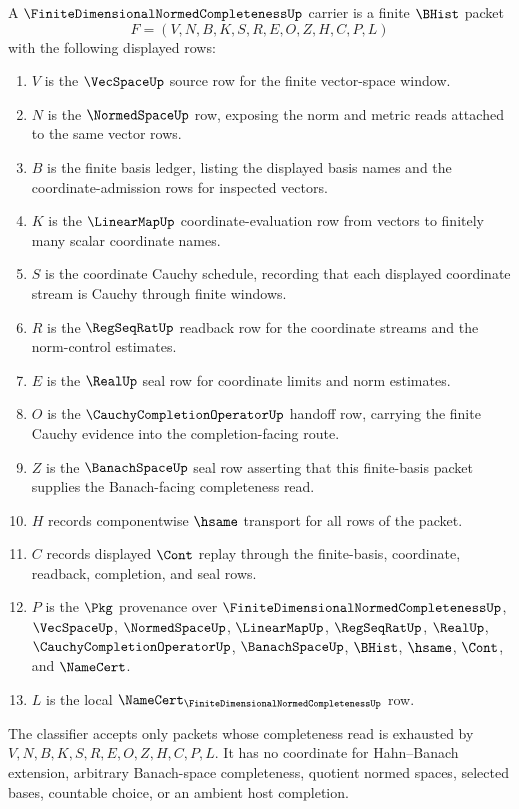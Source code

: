 \begin{definition}
\label{def:finite-dimensional-normed-completeness-carrier}
A $\FiniteDimensionalNormedCompletenessUp$ carrier is a finite $\BHist$ packet
$$
F=(V,N,B,K,S,R,E,O,Z,H,C,P,L)
$$
with the following displayed rows:
\begin{enumerate}
\item $V$ is the $\VecSpaceUp$ source row for the finite vector-space window.
\item $N$ is the $\NormedSpaceUp$ row, exposing the norm and metric reads attached to the same vector rows.
\item $B$ is the finite basis ledger, listing the displayed basis names and the coordinate-admission rows for inspected vectors.
\item $K$ is the $\LinearMapUp$ coordinate-evaluation row from vectors to finitely many scalar coordinate names.
\item $S$ is the coordinate Cauchy schedule, recording that each displayed coordinate stream is Cauchy through finite windows.
\item $R$ is the $\RegSeqRatUp$ readback row for the coordinate streams and the norm-control estimates.
\item $E$ is the $\RealUp$ seal row for coordinate limits and norm estimates.
\item $O$ is the $\CauchyCompletionOperatorUp$ handoff row, carrying the finite Cauchy evidence into the completion-facing route.
\item $Z$ is the $\BanachSpaceUp$ seal row asserting that this finite-basis packet supplies the Banach-facing completeness read.
\item $H$ records componentwise $\hsame$ transport for all rows of the packet.
\item $C$ records displayed $\Cont$ replay through the finite-basis, coordinate, readback, completion, and seal rows.
\item $P$ is the $\Pkg$ provenance over $\FiniteDimensionalNormedCompletenessUp$, $\VecSpaceUp$, $\NormedSpaceUp$, $\LinearMapUp$, $\RegSeqRatUp$, $\RealUp$, $\CauchyCompletionOperatorUp$, $\BanachSpaceUp$, $\BHist$, $\hsame$, $\Cont$, and $\NameCert$.
\item $L$ is the local $\NameCert_{\FiniteDimensionalNormedCompletenessUp}$ row.
\end{enumerate}
The classifier accepts only packets whose completeness read is exhausted by $V,N,B,K,S,R,E,O,Z,H,C,P,L$. It has no coordinate for Hahn--Banach extension, arbitrary Banach-space completeness, quotient normed spaces, selected bases, countable choice, or an ambient host completion.
\end{definition}

